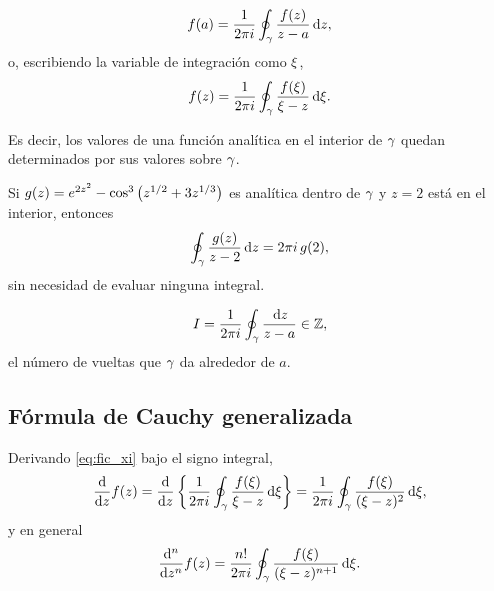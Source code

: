 \begin{teorema}
  \label{teo:fic}
  \begin{equation}
    \label{eq:fic}
    f(a)=\frac{1}{2\pi i}\oint_{\gamma}\frac{f(z)}{z-a}\,\mathrm{d} z,
  \end{equation}
  o, escribiendo la variable de integraci\'on como $\xi$,
  \begin{equation}
    \label{eq:fic_xi}
    f(z)=\frac{1}{2\pi i}\oint_{\gamma}\frac{f(\xi)}{\xi-z}\,\mathrm{d}\xi .
  \end{equation}
\end{teorema}

Es decir, los valores de una funci\'on anal\'itica en el interior de $\gamma$
quedan determinados por sus valores sobre $\gamma$.

\begin{ejemplo}
  \label{ej:fic_aplicada}
  Si $g(z)=e^{2z^2}-\cos^3\left( z^{1/2}+3z^{1/3} \right)$ es anal\'itica dentro de
  $\gamma$ y $z=2$ est\'a en el interior, entonces
  \begin{equation}
    \label{eq:fic_aplicada}
    \oint_{\gamma}\frac{g(z)}{z-2}\,\mathrm{d} z=2\pi i\,g(2),
  \end{equation}
  sin necesidad de evaluar ninguna integral.
\end{ejemplo}

\begin{definicion}[\'Indice]
  \label{def:indice}
  \begin{equation}
    \label{eq:indice}
    I=\frac{1}{2\pi i}\oint_{\gamma}\frac{\,\mathrm{d} z}{z-a}\in\mathbb{Z},
  \end{equation}
  el n\'umero de vueltas que $\gamma$ da alrededor de $a$.
\end{definicion}

\subsection{F\'ormula de Cauchy generalizada}
\label{subsec:cauchy_generalizada}

Derivando \eqref{eq:fic_xi} bajo el signo integral,
\begin{equation}
  \label{eq:fic_derivada}
  \frac{\mathrm{d}}{\mathrm{d}z}f(z)=\frac{\mathrm{d}}{\mathrm{d}z}\left\{ \frac{1}{2\pi i}
    \oint_{\gamma}\frac{f(\xi)}{\xi-z}\,\mathrm{d}\xi \right\}
    =\frac{1}{2\pi i}\oint_{\gamma}\frac{f(\xi)}{(\xi-z)^2}\,\mathrm{d}\xi,
\end{equation}
y en general
\begin{equation}
  \label{eq:fic_general}
  \frac{\mathrm{d}^{n}}{\mathrm{d}z^{n}}f(z)
    =\frac{n!}{2\pi i}\oint_{\gamma}
      \frac{f(\xi)}{(\xi-z)^{n+1}}\,\mathrm{d}\xi .
\end{equation}

